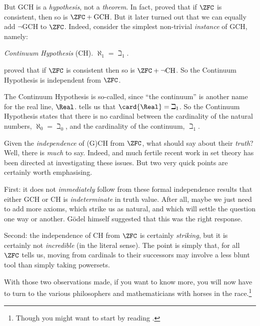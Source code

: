\documentclass[../../../include/open-logic-section]{subfiles}
\begin{document}
But GCH is a \emph{hypothesis}, not a \emph{theorem}. In fact,
\cite{Godel1938} proved that if $\ZFC$ is consistent, then so is
$\ZFC + \text{GCH}$. But it later turned out that we can equally add
$\lnot$GCH to $\ZFC$. Indeed, consider the simplest non-trivial
\emph{instance} of GCH, namely: 

\begin{defish}
\emph{Continuum Hypothesis} (CH). $\aleph_1 = \beth_1$. 
\end{defish}

\cite{Cohen1963} proved that if $\ZFC$ is consistent then so is $\ZFC
+ \lnot\text{CH}$. So the Continuum Hypothesis is independent from $\ZFC$.

The Continuum Hypothesis is so-called, since ``the continuum'' is
another name for the real line, $\Real$.
 tells us that $\card{\Real} =
\beth_1$. So the Continuum Hypothesis states that there is no cardinal
between the cardinality of the natural numbers, $\aleph_0 = \beth_0$,
and the cardinality of the continuum, $\beth_1$.

Given the \emph{independence} of (G)CH from $\ZFC$, what should say
about their \emph{truth}? Well, there is \emph{much} to say. Indeed,
and much fertile recent work in set theory has been directed at
investigating these issues. But two very quick points are certainly worth
emphasising. 

First: it does not \emph{immediately} follow from these formal
independence results that either GCH or CH is \emph{indeterminate} in
truth value. After all, maybe we just need to add more axioms, which
strike us as natural, and which will settle the question one way or
another. G\"odel himself suggested that this was the right response. 

Second: the independence of CH from $\ZFC$ is certainly
\emph{striking}, but it is certainly not \emph{incredible} (in the
literal sense). The point is simply that, for all $\ZFC$ tells us,
moving from cardinals to their successors may involve a less blunt
tool than simply taking powersets.

With those two observations made, if you want to know more, you will
now have to turn to the various philosophers and mathematicians with
horses in the race.\footnote{Though you might want to start by reading \cite[\S15.6]{Potter2004}.}
\end{document}
